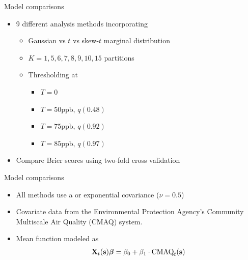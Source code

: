 \documentclass{beamer}
\begin{document}
\begin{frame}{Model comparisons}
  \begin{itemize} \setlength{\itemsep}{0.5em}
    \item 9 different analysis methods incorporating
    \begin{itemize}
      \item Gaussian vs $t$ vs skew-$t$ marginal distribution
      \item $K=1, 5, 6, 7, 8, 9, 10, 15$ partitions
      \item Thresholding at
      \begin{itemize}
         \item $T = 0$
         \item $T = 50$ppb, $q(0.48)$
         \item $T = 75$ppb, $q(0.92)$
         \item $T = 85$ppb, $q(0.97)$
      \end{itemize}
    \end{itemize}
    \item Compare Brier scores using two-fold cross validation
  \end{itemize}
\end{frame}

\begin{frame}{Model comparisons}
  \begin{itemize} \setlength{\itemsep}{0.5em}
    \item All methods use a \Matern or exponential covariance ($\nu = 0.5$)
    \item Covariate data from the Environmental Protection Agency's Community Multiscale Air Quality (CMAQ) system.
    \item Mean function modeled as
    \begin{align*}
    	\mbox{\bf X}_t(\mbox{\bf s}) \mbox{\boldmath $\beta$} = \beta_0 + \beta_1 \cdot \text{CMAQ}_t (\mbox{\bf s})
    \end{align*}
   \end{itemize}
\end{frame}
\end{document}

